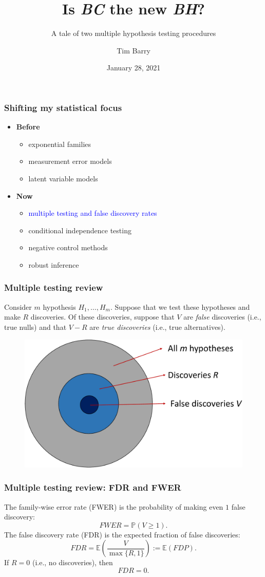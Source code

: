 \documentclass{beamer}
\title{Is \textit{BC} the new \textit{BH}?}
\subtitle{A tale of two multiple hypothesis testing procedures}
\author{Tim Barry}
\date{January 28, 2021}
\begin{document}
\frame{\titlepage}

\begin{frame}
\frametitle{Shifting my statistical focus}
\begin{itemize}
\item \textbf{Before}
\begin{itemize}
\item exponential families
\item measurement error models
\item latent variable models
\end{itemize}
\item \textbf{Now}
\begin{itemize}
\item \textcolor{blue}{multiple testing and false discovery rates}
\item conditional independence testing
\item negative control methods
\item robust inference
\end{itemize}
\end{itemize}
\end{frame}


\begin{frame}
\frametitle{Multiple testing review}
Consider $m$ hypothesis $H_1, \dots, H_m$. Suppose that we test these hypotheses and make $R$ discoveries. Of these discoveries, suppose that $V$ are \textit{false} discoveries (i.e., true nulls) and that $V - R$ are \textit{true discoveries} (i.e., true alternatives).

\begin{figure}
	\centering
	\includegraphics[width=0.8\linewidth]{fdr_fig}
	\label{fdrfig}
\end{figure}
\end{frame}

\begin{frame}
\frametitle{Multiple testing review: FDR and FWER}
The family-wise error rate (FWER) is the probability of making even $1$ false discovery:
$$FWER = \mathbb{P}(V \geq 1).$$
The false discovery rate (FDR) is the expected fraction of false discoveries:
$$FDR = \mathbb{E}\left( \frac{V}{ \max\{ R, 1 \}} \right) := \mathbb{E} \left( FDP \right).$$
If $R = 0$ (i.e., no discoveries), then
$$ FDR = 0.$$
\end{frame}
\end{document}

